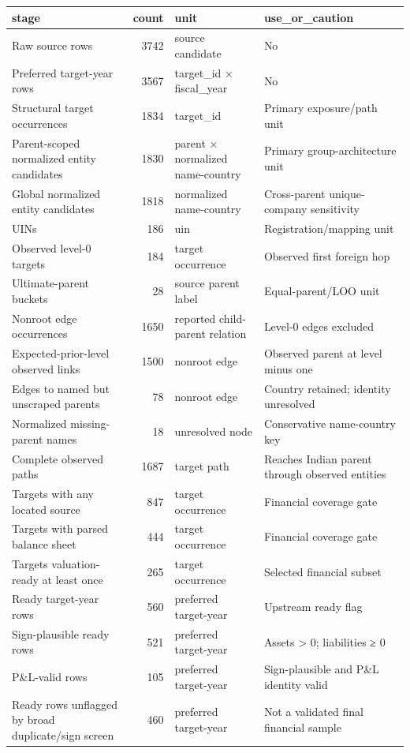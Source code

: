 \begin{tabular}{lrll}
\toprule
stage & count & unit & use\_or\_caution \\
\midrule
Raw source rows & 3742 & source candidate & No \\
Preferred target-year rows & 3567 & target\_id × fiscal\_year & No \\
Structural target occurrences & 1834 & target\_id & Primary exposure/path unit \\
Parent-scoped normalized entity candidates & 1830 & parent × normalized name-country & Primary group-architecture unit \\
Global normalized entity candidates & 1818 & normalized name-country & Cross-parent unique-company sensitivity \\
UINs & 186 & uin & Registration/mapping unit \\
Observed level-0 targets & 184 & target occurrence & Observed first foreign hop \\
Ultimate-parent buckets & 28 & source parent label & Equal-parent/LOO unit \\
Nonroot edge occurrences & 1650 & reported child-parent relation & Level-0 edges excluded \\
Expected-prior-level observed links & 1500 & nonroot edge & Observed parent at level minus one \\
Edges to named but unscraped parents & 78 & nonroot edge & Country retained; identity unresolved \\
Normalized missing-parent names & 18 & unresolved node & Conservative name-country key \\
Complete observed paths & 1687 & target path & Reaches Indian parent through observed entities \\
Targets with any located source & 847 & target occurrence & Financial coverage gate \\
Targets with parsed balance sheet & 444 & target occurrence & Financial coverage gate \\
Targets valuation-ready at least once & 265 & target occurrence & Selected financial subset \\
Ready target-year rows & 560 & preferred target-year & Upstream ready flag \\
Sign-plausible ready rows & 521 & preferred target-year & Assets > 0; liabilities ≥ 0 \\
P\&L-valid rows & 105 & preferred target-year & Sign-plausible and P\&L identity valid \\
Ready rows unflagged by broad duplicate/sign screen & 460 & preferred target-year & Not a validated final financial sample \\
\bottomrule
\end{tabular}
